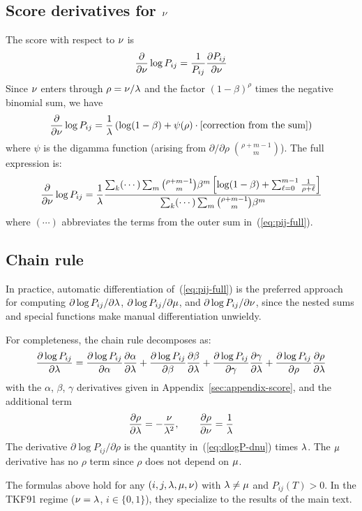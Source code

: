 \subsection{\texorpdfstring{Score derivatives for $\nu$}{Score derivatives for nu}}

The score with respect to $\nu$ is
\[
\frac{\partial}{\partial\nu}\log P_{ij}
= \frac{1}{P_{ij}} \frac{\partial P_{ij}}{\partial\nu}
\]
Since $\nu$ enters through $\rho = \nu/\lambda$ and the factor $(1-\beta)^\rho$
times the negative binomial sum, we have
\begin{equation}
\frac{\partial}{\partial\nu}\log P_{ij}
= \frac{1}{\lambda}\left(
  \log(1-\beta) + \psi(\rho) \cdot [\text{correction from the sum}]
\right)
\end{equation}
where $\psi$ is the digamma function (arising from $\partial/\partial\rho\;\binom{\rho+m-1}{m}$).
The full expression is:
\begin{equation}\label{eq:dlogP-dnu}
\frac{\partial}{\partial\nu}\log P_{ij} = \frac{1}{\lambda}
  \frac{\sum_k (\cdots) \sum_m \binom{\rho+m-1}{m}\beta^m
  \left[\log(1-\beta) + \sum_{\ell=0}^{m-1}\frac{1}{\rho+\ell}\right]}
  {\sum_k (\cdots) \sum_m \binom{\rho+m-1}{m}\beta^m}
\end{equation}
where $(\cdots)$ abbreviates the terms from the outer sum in~(\ref{eq:pij-full}).

\subsection{Chain rule}

In practice, automatic differentiation of~(\ref{eq:pij-full})
is the preferred approach for computing
$\partial\log P_{ij}/\partial\lambda$,
$\partial\log P_{ij}/\partial\mu$, and
$\partial\log P_{ij}/\partial\nu$,
since the nested sums and special functions make manual differentiation unwieldy.

For completeness, the chain rule decomposes as:
\[
\frac{\partial\log P_{ij}}{\partial\lambda}
= \frac{\partial\log P_{ij}}{\partial\alpha}\frac{\partial\alpha}{\partial\lambda}
+ \frac{\partial\log P_{ij}}{\partial\beta}\frac{\partial\beta}{\partial\lambda}
+ \frac{\partial\log P_{ij}}{\partial\gamma}\frac{\partial\gamma}{\partial\lambda}
+ \frac{\partial\log P_{ij}}{\partial\rho}\frac{\partial\rho}{\partial\lambda}
\]
with the $\alpha$, $\beta$, $\gamma$ derivatives given in Appendix~\ref{sec:appendix-score},
and the additional term
\[
\frac{\partial\rho}{\partial\lambda} = -\frac{\nu}{\lambda^2}, \qquad
\frac{\partial\rho}{\partial\nu} = \frac{1}{\lambda}
\]
The derivative $\partial\log P_{ij}/\partial\rho$ is the quantity in~(\ref{eq:dlogP-dnu})
times $\lambda$.
The $\mu$ derivative has no $\rho$ term since $\rho$ does not depend on $\mu$.

The formulas above hold for any $(i,j,\lambda,\mu,\nu)$ with $\lambda \neq \mu$
and $P_{ij}(T) > 0$.
In the TKF91 regime ($\nu = \lambda$, $i \in \{0,1\}$),
they specialize to the results of the main text.
